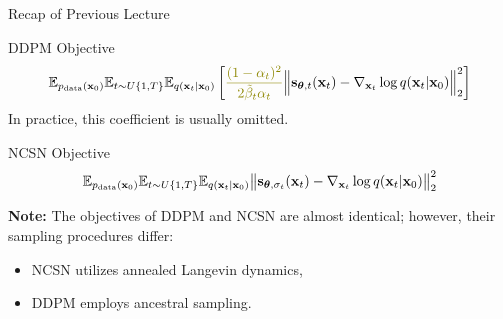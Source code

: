 \documentclass{beamer}
\begin{document}
\begin{frame}{Recap of Previous Lecture}
	\begin{block}{DDPM Objective}
		\vspace{-0.5cm}
		\[
			\bbE_{\pd(\bx_0)} \bbE_{t \sim U\{1, T\}}\bbE_{q(\bx_t | \bx_0)} \left[ {\color{olive}\frac{(1 - \alpha_t)^2}{2\tilde{\beta}_t \alpha_t}} \Bigl\|  \bs_{\btheta, t} (\bx_t) - \nabla_{\bx_t} \log q(\bx_t | \bx_0) \Bigr\|_2^2  \right]
		\]
		In practice, {\color{olive}this coefficient} is usually omitted.
	\end{block}
	\begin{block}{NCSN Objective}
		\vspace{-0.3cm}
		\[
			\mathbb{E}_{p_{\text{data}}(\mathbf{x}_0)} \mathbb{E}_{t \sim U\{1, T\}} \mathbb{E}_{q(\mathbf{x}_t | \mathbf{x}_0)}\bigl\| \mathbf{s}_{\boldsymbol{\theta}, \sigma_t}(\mathbf{x}_t) - \nabla_{\mathbf{x}_t} \log q(\mathbf{x}_t | \mathbf{x}_0) \bigr\|^2_2 
		\]
		\vspace{-0.3cm}
	\end{block}
	\textbf{Note:} The objectives of DDPM and NCSN are almost identical; however, their sampling procedures differ:
	\begin{itemize}
		\item NCSN utilizes annealed Langevin dynamics,
		\item DDPM employs ancestral sampling.
	\end{itemize}
\end{frame}
\end{document}
